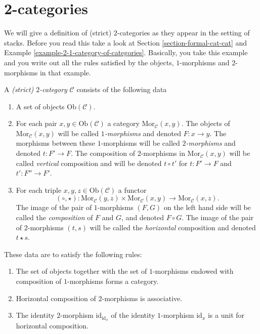 \section{2-categories}
\label{section-2-categories}

\noindent
We will give a definition of (strict) $2$-categories as they appear
in the setting of stacks. Before you read this take a look at
Section \ref{section-formal-cat-cat} and Example
\ref{example-2-1-category-of-categories}. Basically, you take this example
and you write out all the rules satisfied by the objects, $1$-morphisms
and $2$-morphisms in that example.

\begin{definition}
\label{definition-2-category}
A {\it (strict) $2$-category} $\mathcal{C}$ consists of the following data
\begin{enumerate}
\item A set of objects $\text{Ob}(\mathcal{C})$.
\item For each pair $x,y \in \text{Ob}(\mathcal{C})$
a category $\text{Mor}_\mathcal{C}(x,y)$. The objects of
$\text{Mor}_\mathcal{C}(x,y)$ will be called {\it $1$-morphisms}
and denoted $F : x \to y$. The morphisms between these $1$-morphisms
will be called {\it $2$-morphisms} and denoted $t : F' \to F$.
The composition of $2$-morphisms in $\text{Mor}_\mathcal{C}(x,y)$
will be called {\it vertical} composition and will be
denoted $t \circ t'$ for $t : F' \to F$ and $t' : F'' \to F'$.
\item For each triple $x,y,z\in \text{Ob}(\mathcal{C})$ a
functor
$$
(\circ, \star) : 
\text{Mor}_\mathcal{C}(y,z) \times \text{Mor}_\mathcal{C}(x,y) 
\longrightarrow
\text{Mor}_\mathcal{C}(x,z).
$$
The image of the pair of $1$-morphisms $(F,G)$ on the left hand side
will be called the {\it composition} of $F$ and $G$, and denoted
$F\circ G$. The image of the pair of $2$-morphisms $(t,s)$ will
be called the {\it horizontal} composition and denoted $t \star s$.
\end{enumerate}
These data are to satisfy the following rules:
\begin{enumerate}
\item The set of objects together with the set of $1$-morphisms endowed
with composition of $1$-morphisms forms a category.
\item Horizontal composition of $2$-morphisms is associative.
\item The identity $2$-morphism $\text{id}_{\text{id}_x}$
of the identity $1$-morphism $\text{id}_x$ is a unit for
horizontal composition.
\end{enumerate}
\end{definition}

